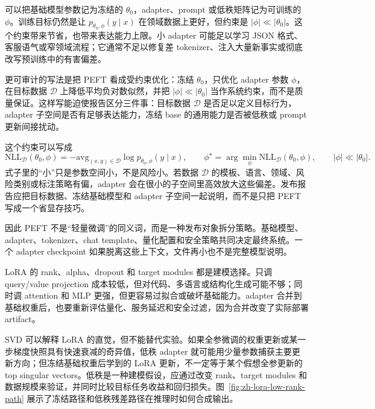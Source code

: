 \documentclass[UTF8,zihao=-4,openany]{ctexbook}
\begin{document}
可以把基础模型参数记为冻结的 $\theta_0$，adapter、prompt 或低秩矩阵记为可训练的 $\phi$。训练目标仍然是让 $p_{\theta_0,\phi}(y\mid x)$ 在领域数据上更好，但约束是 $|\phi|\ll|\theta_0|$。这个约束带来节省，也带来表达能力上限。小 adapter 可能足以学习 JSON 格式、客服语气或窄领域流程；它通常不足以修复差 tokenizer、注入大量新事实或彻底改写预训练中的有害偏差。

更可审计的写法是把 PEFT 看成受约束优化：冻结 $\theta_0$，只优化 adapter 参数 $\phi$，在目标数据 $\mathcal D$ 上降低平均负对数似然，并把 $|\phi|\ll|\theta_0|$ 当作系统约束，而不是质量保证。这样写能迫使报告区分三件事：目标数据 $\mathcal D$ 是否足以定义目标行为，adapter 子空间是否有足够表达能力，冻结 base 的通用能力是否被低秩或 prompt 更新间接扰动。

这个约束可以写成
\[
  \mathrm{NLL}_{\mathcal D}(\theta_0,\phi)
  =-\mathrm{avg}_{(x,y)\in\mathcal D}\log p_{\theta_0,\phi}(y\mid x),
  \qquad
  \phi^\star=\arg\min_{\phi}\mathrm{NLL}_{\mathcal D}(\theta_0,\phi),
  \qquad
  |\phi|\ll|\theta_0|.
\]
式子里的“小”只是参数空间小，不是风险小。若数据 $\mathcal D$ 的模板、语言、领域、风险类别或标注策略有偏，adapter 会在很小的子空间里高效放大这些偏差。发布报告应把目标数据、冻结基础模型和 adapter 子空间一起说明，而不是只把 PEFT 写成一个省显存技巧。

因此 PEFT 不是“轻量微调”的同义词，而是一种发布对象拆分策略。基础模型、adapter、tokenizer、chat template、量化配置和安全策略共同决定最终系统。一个 adapter checkpoint 如果脱离这些上下文，文件再小也不是完整模型说明。

LoRA 的 rank、alpha、dropout 和 target modules 都是建模选择。只调 query/value projection 成本较低，但对代码、多语言或结构化生成可能不够；同时调 attention 和 MLP 更强，但更容易过拟合或破坏基础能力。adapter 合并到基础权重后，也要重新评估量化、服务延迟和安全过滤，因为合并改变了实际部署 artifact。

SVD 可以解释 LoRA 的直觉，但不能替代实验。如果全参微调的权重更新或某一步梯度快照具有快速衰减的奇异值，低秩 adapter 就可能用少量参数捕获主要更新方向；但冻结基础权重后学到的 LoRA 更新，不一定等于某个假想全参更新的 top singular vectors。低秩是一种建模假设，应通过改变 rank、target modules 和数据规模来验证，并同时比较目标任务收益和回归损失。图~\ref{fig:zh-lora-low-rank-path} 展示了冻结路径和低秩残差路径在推理时如何合成输出。
\end{document}
